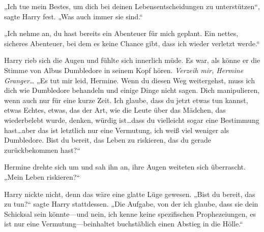 „Ich tue mein Bestes, um dich bei deinen Lebensentscheidungen zu unterstützen“, sagte Harry fest. „Was auch immer sie sind.“

„Ich nehme an, du hast bereits ein Abenteuer für mich geplant. Ein nettes, sicheres Abenteuer, bei dem es keine Chance gibt, dass ich wieder verletzt werde.“

Harry rieb sich die Augen und fühlte sich innerlich müde. Es war, als könne er die Stimme von Albus Dumbledore in seinem Kopf hören.
\emph{Verzeih mir, Hermine Granger…}
„Es tut mir leid, Hermine. Wenn du diesen Weg weitergehst, muss ich dich wie Dumbledore behandeln und einige Dinge nicht sagen. Dich manipulieren, wenn auch nur für eine kurze Zeit. Ich glaube, dass du jetzt etwas tun kannst, etwas Echtes, etwas, das der Art, wie die Leute über das Mädchen, das wiederbelebt wurde, denken, würdig ist…dass du vielleicht sogar eine Bestimmung hast…aber das ist letztlich nur eine Vermutung, ich weiß viel weniger als Dumbledore. Bist du bereit, das Leben zu riskieren, das du gerade zurückbekommen hast?“

Hermine drehte sich um und sah ihn an, ihre Augen weiteten sich überrascht. „Mein Leben riskieren?“

Harry nickte nicht, denn das wäre eine glatte Lüge gewesen.
„Bist du bereit, das zu tun?“ sagte Harry stattdessen. „Die Aufgabe, von der ich glaube, dass sie dein Schicksal sein könnte—und nein, ich kenne keine spezifischen Prophezeiungen, es ist nur eine Vermutung—beinhaltet buchstäblich einen Abstieg in die Hölle.“

